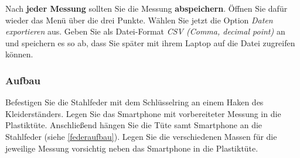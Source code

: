 \documentclass[12pt]{scrbook}
\begin{document}
Nach \textbf{jeder Messung} sollten Sie die Messung \textbf{abspeichern}. Öffnen Sie dafür wieder das Menü über die drei Punkte. Wählen Sie jetzt die Option \textit{Daten exportieren} aus. Geben Sie als Datei-Format \textit{CSV (Comma, decimal point)} an und speichern es so ab, dass Sie später mit ihrem Laptop auf die Datei zugreifen können.

\subsubsection{Aufbau}
Befestigen Sie die Stahlfeder mit dem Schlüsselring an einem Haken des Kleiderständers. Legen Sie das Smartphone mit vorbereiteter Messung in die Plastiktüte. Anschließend hängen Sie die Tüte samt Smartphone an die Stahlfeder (siehe \autoref{federaufbau}). Legen Sie die verschiedenen Massen für die jeweilige Messung vorsichtig neben das Smartphone in die Plastiktüte.
\end{document}

